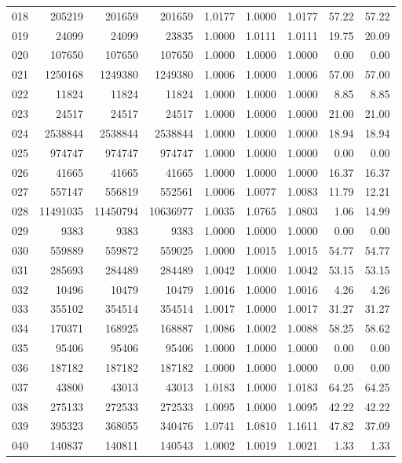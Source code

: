 \begin{longtable}{crrrrrrrr}
018 & 205219 & 201659 & 201659 & 1.0177 & 1.0000 & 1.0177 & 57.22 & 57.22 \\
019 & 24099 & 24099 & 23835 & 1.0000 & 1.0111 & 1.0111 & 19.75 & 20.09 \\
020 & 107650 & 107650 & 107650 & 1.0000 & 1.0000 & 1.0000 & 0.00 & 0.00 \\
021 & 1250168 & 1249380 & 1249380 & 1.0006 & 1.0000 & 1.0006 & 57.00 & 57.00 \\
022 & 11824 & 11824 & 11824 & 1.0000 & 1.0000 & 1.0000 & 8.85 & 8.85 \\
023 & 24517 & 24517 & 24517 & 1.0000 & 1.0000 & 1.0000 & 21.00 & 21.00 \\
024 & 2538844 & 2538844 & 2538844 & 1.0000 & 1.0000 & 1.0000 & 18.94 & 18.94 \\
025 & 974747 & 974747 & 974747 & 1.0000 & 1.0000 & 1.0000 & 0.00 & 0.00 \\
026 & 41665 & 41665 & 41665 & 1.0000 & 1.0000 & 1.0000 & 16.37 & 16.37 \\
027 & 557147 & 556819 & 552561 & 1.0006 & 1.0077 & 1.0083 & 11.79 & 12.21 \\
028 & 11491035 & 11450794 & 10636977 & 1.0035 & 1.0765 & 1.0803 & 1.06 & 14.99 \\
029 & 9383 & 9383 & 9383 & 1.0000 & 1.0000 & 1.0000 & 0.00 & 0.00 \\
030 & 559889 & 559872 & 559025 & 1.0000 & 1.0015 & 1.0015 & 54.77 & 54.77 \\
031 & 285693 & 284489 & 284489 & 1.0042 & 1.0000 & 1.0042 & 53.15 & 53.15 \\
032 & 10496 & 10479 & 10479 & 1.0016 & 1.0000 & 1.0016 & 4.26 & 4.26 \\
033 & 355102 & 354514 & 354514 & 1.0017 & 1.0000 & 1.0017 & 31.27 & 31.27 \\
034 & 170371 & 168925 & 168887 & 1.0086 & 1.0002 & 1.0088 & 58.25 & 58.62 \\
035 & 95406 & 95406 & 95406 & 1.0000 & 1.0000 & 1.0000 & 0.00 & 0.00 \\
036 & 187182 & 187182 & 187182 & 1.0000 & 1.0000 & 1.0000 & 0.00 & 0.00 \\
037 & 43800 & 43013 & 43013 & 1.0183 & 1.0000 & 1.0183 & 64.25 & 64.25 \\
038 & 275133 & 272533 & 272533 & 1.0095 & 1.0000 & 1.0095 & 42.22 & 42.22 \\
039 & 395323 & 368055 & 340476 & 1.0741 & 1.0810 & 1.1611 & 47.82 & 37.09 \\
040 & 140837 & 140811 & 140543 & 1.0002 & 1.0019 & 1.0021 & 1.33 & 1.33 \\

\end{longtable}
